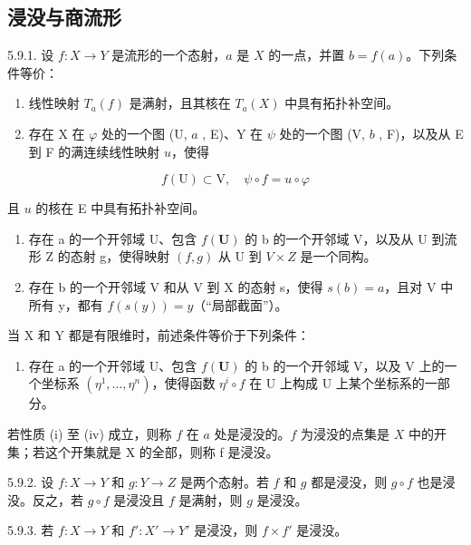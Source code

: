\subsection{浸没与商流形}

5.9.1. 设 \(f: X \to Y\) 是流形的一个态射，\(a\) 是 \(X\) 的一点，并置 \(b = f(a)\)。下列条件等价：

\begin{enumerate}
\def\labelenumi{(\roman{enumi})}
\item
  线性映射 \(T_{a}(f)\) 是满射，且其核在 \(T_{a}(X)\) 中具有拓扑补空间。
\item
  存在 X 在 \(\varphi\) 处的一个图 (U, \(a\) , E)、Y 在 \(\psi\) 处的一个图 (V, \(b\) , F)，以及从 E 到 F 的满连续线性映射 \(u\)，使得
\end{enumerate}

\[
f (\mathrm{U}) \subset \mathrm{V}, \quad \psi \circ f = u \circ \varphi
\]

且 \(u\) 的核在 E 中具有拓扑补空间。

\begin{enumerate}
\def\labelenumi{(\roman{enumi})}
\setcounter{enumi}{2}
\item
  存在 a 的一个开邻域 U、包含 \(f(\mathbf{U})\) 的 b 的一个开邻域 V，以及从 U 到流形 Z 的态射 g，使得映射 \((f,g)\) 从 U 到 \(V \times Z\) 是一个同构。
\item
  存在 b 的一个开邻域 V 和从 V 到 X 的态射 s，使得 \(s(b) = a\)，且对 V 中所有 y，都有 \(f(s(y)) = y\)（“局部截面”）。
\end{enumerate}

当 X 和 Y 都是有限维时，前述条件等价于下列条件：

\begin{enumerate}
\def\labelenumi{(\alph{enumi})}
\setcounter{enumi}{21}
\tightlist
\item
  存在 a 的一个开邻域 U、包含 \(f(\mathbf{U})\) 的 b 的一个开邻域 V，以及 V 上的一个坐标系 \((\eta^{1},\ldots,\eta^{n})\)，使得函数 \(\eta^{i}\circ f\) 在 U 上构成 U 上某个坐标系的一部分。
\end{enumerate}

若性质 (i) 至 (iv) 成立，则称 \(f\) 在 \(a\) 处是浸没的。\(f\) 为浸没的点集是 \(X\) 中的开集；若这个开集就是 X 的全部，则称 f 是浸没。

5.9.2. 设 \(f: X \to Y\) 和 \(g: Y \to Z\) 是两个态射。若 \(f\) 和 \(g\) 都是浸没，则 \(g \circ f\) 也是浸没。反之，若 \(g \circ f\) 是浸没且 \(f\) 是满射，则 \(g\) 是浸没。

5.9.3. 若 \(f: X \to Y\) 和 \(f': X' \to Y'\) 是浸没，则 \(f \times f'\) 是浸没。


